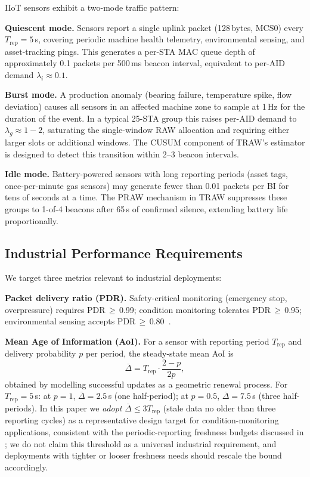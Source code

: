 \documentclass[journal]{IEEEtran}
\begin{document}
IIoT sensors exhibit a two-mode traffic pattern:

\textbf{Quiescent mode.}
Sensors report a single uplink packet (128\,bytes, MCS0) every
$T_\mathrm{rep}\!=\!5$\,s, covering periodic machine health telemetry,
environmental sensing, and asset-tracking pings.
This generates a per-STA MAC queue depth of approximately 0.1 packets
per 500\,ms beacon interval, equivalent to per-AID demand
$\lambda_i\!\approx\!0.1$.

\textbf{Burst mode.}
A production anomaly (bearing failure, temperature spike, flow deviation)
causes all sensors in an affected machine zone to sample at 1\,Hz for
the duration of the event.
In a typical 25-STA group this raises per-AID demand to
$\lambda_g\!\approx\!1\!-\!2$, saturating the single-window RAW
allocation and requiring either larger slots or additional windows.
The CUSUM component of TRAW's estimator is designed to detect this
transition within 2--3 beacon intervals.

\textbf{Idle mode.}
Battery-powered sensors with long reporting periods (asset tags,
once-per-minute gas sensors) may generate fewer than 0.01 packets per BI
for tens of seconds at a time.
The PRAW mechanism in TRAW suppresses these groups to 1-of-4 beacons
after 65\,s of confirmed silence, extending battery life proportionally.

\subsection{Industrial Performance Requirements}

We target three metrics relevant to industrial deployments:

\textbf{Packet delivery ratio (PDR).}
Safety-critical monitoring (emergency stop, overpressure) requires
PDR\,$\geq$\,0.99; condition monitoring tolerates PDR\,$\geq$\,0.95;
environmental sensing accepts PDR\,$\geq$\,0.80~\cite{Sisinni2018}.

\textbf{Mean Age of Information (AoI).}
For a sensor with reporting period $T_\mathrm{rep}$ and delivery
probability $p$ per period, the steady-state mean AoI is
\begin{equation}
  \overline{\Delta} = T_\mathrm{rep}\cdot\frac{2-p}{2p},
  \label{eq:aoi}
\end{equation}
obtained by modelling successful updates as a geometric renewal process.
For $T_\mathrm{rep}\!=\!5$\,s:
at $p\!=\!1$, $\overline{\Delta}\!=\!2.5$\,s (one half-period);
at $p\!=\!0.5$, $\overline{\Delta}\!=\!7.5$\,s (three half-periods).
In this paper we \emph{adopt} $\overline{\Delta}\!\leq\!3T_\mathrm{rep}$
(stale data no older than three reporting cycles) as a representative
design target for condition-monitoring applications, consistent with
the periodic-reporting freshness budgets discussed in
\cite{Sisinni2018}; we do not claim this threshold as a universal
industrial requirement, and deployments with tighter or looser
freshness needs should rescale the bound accordingly.
\end{document}
